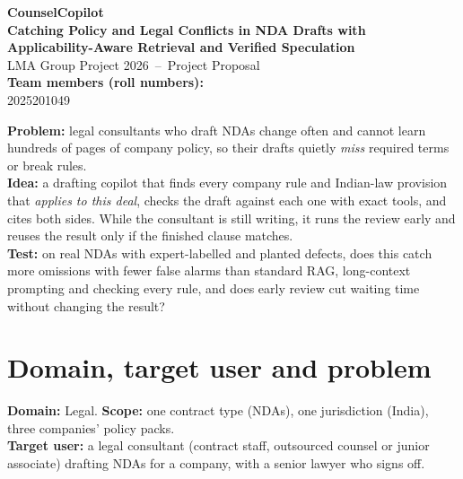 \documentclass[11pt,a4paper]{article}
\begin{document}
\begin{center}
{\LARGE\bfseries\color{accent} CounselCopilot}\\[3pt]
{\Large\bfseries\color{accent} Catching Policy and Legal Conflicts in NDA Drafts with\\[1pt]
Applicability-Aware Retrieval and Verified Speculation}\\[6pt]
{\large LMA Group Project 2026 \,--\, Project Proposal}\\[3pt]
\textbf{Team members (roll numbers):}\\[1pt]
2025201049   
\end{center}

\begin{keybox}[title=Summary in three lines]
\textbf{Problem:} legal consultants who draft NDAs change often and cannot learn hundreds of pages of company policy, so their drafts quietly \emph{miss} required terms or break rules.\\
\textbf{Idea:} a drafting copilot that finds every company rule and Indian-law provision that \emph{applies to this deal}, checks the draft against each one with exact tools, and cites both sides. While the consultant is still writing, it runs the review early and reuses the result only if the finished clause matches.\\
\textbf{Test:} on real NDAs with expert-labelled and planted defects, does this catch more omissions with fewer false alarms than standard RAG, long-context prompting and checking every rule, and does early review cut waiting time without changing the result?
\end{keybox}

\section{Domain, target user and problem}
\textbf{Domain:} Legal. \textbf{Scope:} one contract type (NDAs), one jurisdiction (India), three companies' policy packs.\\
\textbf{Target user:} a legal consultant (contract staff, outsourced counsel or junior associate) drafting NDAs for a company, with a senior lawyer who signs off.
\end{document}

